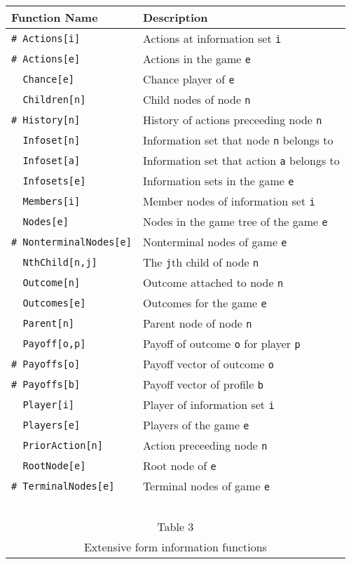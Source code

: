 \begin{table}[htp]
\begin{center}
\begin{tabular} {|l||l|} \hline
Function Name	& Description \\ 
\hline
\verb+# Actions[i]+ & Actions at information set \verb+i+ \\
\verb+# Actions[e]+ & Actions in the game \verb+e+ \\
\verb+  Chance[e]+ & Chance player of \verb+e+ \\
\verb+  Children[n]+ & Child nodes of node \verb+n+ \\
\verb+# History[n]+ & History of actions preceeding node \verb+n+ \\
\verb+  Infoset[n]+ & Information set that node \verb+n+ belongs to\\
\verb+  Infoset[a]+ & Information set that action \verb+a+ belongs to\\
\verb+  Infosets[e]+ & Information sets in the game \verb+e+\\
\verb+  Members[i]+ & Member nodes of information set \verb+i+\\
\verb+  Nodes[e]+ & Nodes in the game tree of the game \verb+e+\\
\verb+# NonterminalNodes[e]+ & Nonterminal nodes of game \verb+e+\\
\verb+  NthChild[n,j]+ & The \verb+j+th child of node \verb+n+ \\
\verb+  Outcome[n]+ & Outcome attached to node \verb+n+ \\
\verb+  Outcomes[e]+ & Outcomes for the game \verb+e+ \\
\verb+  Parent[n]+ & Parent node of node \verb+n+ \\
\verb+  Payoff[o,p]+ & Payoff  of outcome \verb+o+ for player \verb+p+ \\
\verb+# Payoffs[o]+ & Payoff vector of outcome \verb+o+ \\
\verb+# Payoffs[b]+ & Payoff vector of profile \verb+b+ \\
\verb+  Player[i]+ & Player of information set \verb+i+ \\
\verb+  Players[e]+ & Players of the game \verb+e+ \\
\verb+  PriorAction[n]+ & Action preceeding node \verb+n+ \\
\verb+  RootNode[e]+ & Root node of \verb+e+ \\
\verb+# TerminalNodes[e]+ & Terminal nodes of game \verb+e+\\
\hline
\multicolumn{2}{c}{\ }\\
\multicolumn{2}{c}{Table 3}\\
\multicolumn{2}{c}{Extensive form information functions}\\
\end{tabular}
\end{center}
\end{table}
\medskip

